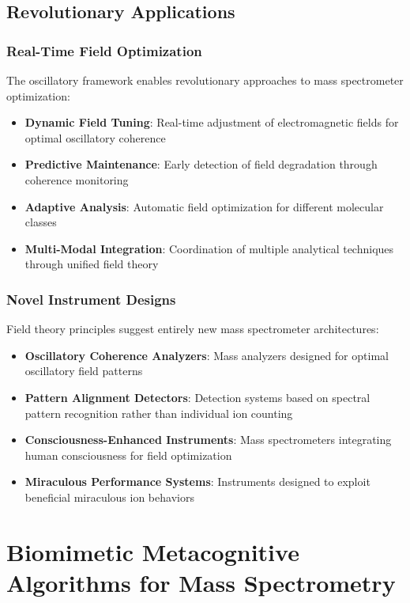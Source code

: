 \documentclass[11pt,a4paper]{article}
\theoremstyle{remark}
\begin{document}
\subsection{Revolutionary Applications}

\subsubsection{Real-Time Field Optimization}

The oscillatory framework enables revolutionary approaches to mass spectrometer optimization:

\begin{itemize}
\item \textbf{Dynamic Field Tuning}: Real-time adjustment of electromagnetic fields for optimal oscillatory coherence
\item \textbf{Predictive Maintenance}: Early detection of field degradation through coherence monitoring
\item \textbf{Adaptive Analysis}: Automatic field optimization for different molecular classes
\item \textbf{Multi-Modal Integration}: Coordination of multiple analytical techniques through unified field theory
\end{itemize}

\subsubsection{Novel Instrument Designs}

Field theory principles suggest entirely new mass spectrometer architectures:

\begin{itemize}
\item \textbf{Oscillatory Coherence Analyzers}: Mass analyzers designed for optimal oscillatory field patterns
\item \textbf{Pattern Alignment Detectors}: Detection systems based on spectral pattern recognition rather than individual ion counting
\item \textbf{Consciousness-Enhanced Instruments}: Mass spectrometers integrating human consciousness for field optimization
\item \textbf{Miraculous Performance Systems}: Instruments designed to exploit beneficial miraculous ion behaviors
\end{itemize}

\section{Biomimetic Metacognitive Algorithms for Mass Spectrometry}
\end{document}
